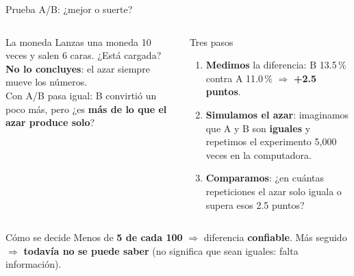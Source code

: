 \documentclass[aspectratio=169,xcolor=dvipsnames]{beamer}
\begin{document}
\begin{frame}{Prueba A/B: ¿mejor o suerte?}
\begin{columns}[T]
  \begin{exampleblock}{La moneda}
    \footnotesize Lanzas una moneda 10 veces y salen 6 caras. ¿Está cargada? \textbf{No lo concluyes}: el azar siempre mueve los números.\\[3pt]
    Con A/B pasa igual: B convirtió un poco más, pero ¿es \textbf{más de lo que el azar produce solo}?
  \end{exampleblock}
  \begin{block}{Tres pasos}
    \footnotesize
    \begin{enumerate}
      \item \textbf{Medimos} la diferencia: B 13.5\,\% contra A 11.0\,\% $\Rightarrow$ \textbf{+2.5 puntos}.
      \item \textbf{Simulamos el azar}: imaginamos que A y B son \textbf{iguales} y repetimos el experimento 5{,}000 veces en la computadora.
      \item \textbf{Comparamos}: ¿en cuántas repeticiones el azar solo iguala o supera esos 2.5 puntos?
    \end{enumerate}
  \end{block}
\end{columns}
\vspace{4pt}
\begin{alertblock}{Cómo se decide}
  \footnotesize Menos de \textbf{5 de cada 100} $\Rightarrow$ diferencia \textbf{confiable}. Más seguido $\Rightarrow$ \textbf{todavía no se puede saber} (no significa que sean iguales: falta información).
\end{alertblock}
\end{frame}
\end{document}

